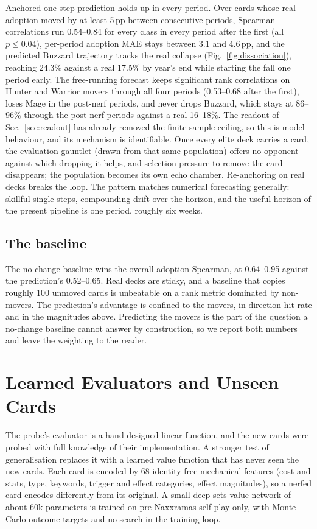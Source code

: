 \documentclass[conference]{IEEEtran}
\newcommand{\pp}{\,\text{pp}}
\begin{document}
Anchored one-step prediction holds up in every period. Over cards
whose real adoption moved by at least 5$\pp$ between consecutive
periods, Spearman correlations run 0.54--0.84 for every class in
every period after the first (all $p\le0.04$), per-period adoption
MAE stays between 3.1 and 4.6$\pp$, and the predicted Buzzard
trajectory tracks the real collapse
(Fig.~\ref{fig:dissociation}), reaching 24.3\% against a real
17.5\% by year's end while starting the fall one period early. The
free-running forecast keeps significant rank correlations on
Hunter and Warrior movers through all four periods (0.53--0.68
after the first), loses Mage in the post-nerf periods, and never
drops Buzzard, which stays at 86--96\% through the post-nerf
periods against a real 16--18\%. The readout of
Sec.~\ref{sec:readout} has already removed the finite-sample
ceiling, so this is model behaviour, and its mechanism is
identifiable. Once every elite deck carries a card, the evaluation
gauntlet (drawn from that same population) offers no opponent
against which dropping it helps, and selection pressure to remove
the card disappears; the population becomes its own echo chamber.
Re-anchoring on real decks breaks the loop. The pattern matches
numerical forecasting generally: skillful single steps, compounding
drift over the horizon, and the useful horizon of the present
pipeline is one period, roughly six weeks.

\subsection{The baseline}
The no-change baseline wins the overall adoption Spearman, at
0.64--0.95 against the prediction's 0.52--0.65. Real decks are
sticky, and a baseline that copies roughly 100 unmoved cards is
unbeatable on a rank metric dominated by non-movers. The
prediction's advantage is confined to the movers, in direction
hit-rate and in the magnitudes above. Predicting the movers is the
part of the question a no-change baseline cannot answer by
construction, so we report both numbers and leave the weighting to
the reader.

\section{Learned Evaluators and Unseen Cards}
\label{sec:neural}

The probe's evaluator is a hand-designed linear function, and the
new cards were probed with full knowledge of their implementation. A
stronger test of generalisation replaces it with a learned value
function that has never seen the new cards. Each card is encoded by
68 identity-free mechanical features (cost and stats, type,
keywords, trigger and effect categories, effect magnitudes), so a
nerfed card encodes differently from its original. A small deep-sets
value network of about 60k parameters is trained on pre-Naxxramas
self-play only, with Monte Carlo outcome targets and no search in
the training loop.
\end{document}
